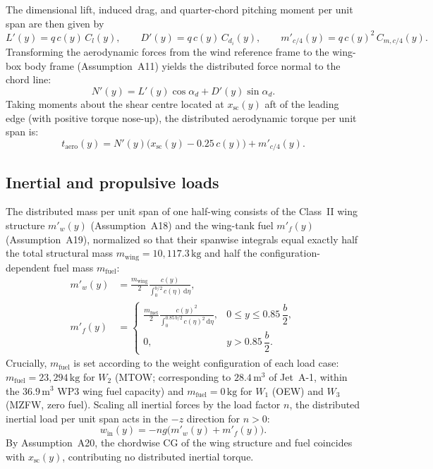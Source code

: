 The dimensional lift, induced drag, and quarter-chord pitching moment per unit span are then given by
\begin{equation}
    L'(y) = q\,c(y)\,C_l(y), \qquad
    D'(y) = q\,c(y)\,C_{d_i}(y), \qquad
    m'_{c/4}(y) = q\,c(y)^2\,C_{m,c/4}(y).
    \label{eq:aero_dimensional}
\end{equation}
Transforming the aerodynamic forces from the wind reference frame to the wing-box body frame (Assumption~A11) yields the distributed force normal to the chord line:
\begin{equation}
    N'(y) = L'(y)\cos\alpha_d + D'(y)\sin\alpha_d.
    \label{eq:normal_force}
\end{equation}
Taking moments about the shear centre located at $x_{\mathrm{sc}}(y)$ aft of the leading edge (with positive torque nose-up), the distributed aerodynamic torque per unit span is:
\begin{equation}
    t_{\mathrm{aero}}(y) = N'(y)\bigl(x_{\mathrm{sc}}(y) - 0.25\,c(y)\bigr) + m'_{c/4}(y).
    \label{eq:aero_torque}
\end{equation}

\subsection{Inertial and propulsive loads}
\label{subsec:inertial_prop_loads}

The distributed mass per unit span of one half-wing consists of the Class~II wing structure $m'_w(y)$ (Assumption~A18) and the wing-tank fuel $m'_f(y)$ (Assumption~A19), normalized so that their spanwise integrals equal exactly half the total structural mass $m_{\mathrm{wing}} = 10{,}117.3\,\text{kg}$ and half the configuration-dependent fuel mass $m_{\mathrm{fuel}}$:
\begin{align}
    m'_w(y) &= \frac{m_{\mathrm{wing}}}{2}\frac{c(y)}{\int_0^{b/2} c(\eta)\,\mathrm{d}\eta}, \label{eq:mw_dist} \\
    m'_f(y) &= \begin{cases}
        \displaystyle \frac{m_{\mathrm{fuel}}}{2}\frac{c(y)^2}{\int_0^{0.85\,b/2} c(\eta)^2\,\mathrm{d}\eta}, & 0 \le y \le 0.85\,\dfrac{b}{2}, \\[10pt]
        0, & y > 0.85\,\dfrac{b}{2}.
    \end{cases}
    \label{eq:mf_dist}
\end{align}
Crucially, $m_{\mathrm{fuel}}$ is set according to the weight configuration of each load case: $m_{\mathrm{fuel}} = 23{,}294\,\text{kg}$ for $W_2$ (MTOW; corresponding to $28.4\,\text{m}^3$ of Jet~A-1, within the $36.9\,\text{m}^3$ WP3 wing fuel capacity) and $m_{\mathrm{fuel}} = 0\,\text{kg}$ for $W_1$ (OEW) and $W_3$ (MZFW, zero fuel). Scaling all inertial forces by the load factor $n$, the distributed inertial load per unit span acts in the $-z$ direction for $n > 0$:
\begin{equation}
    w_{\mathrm{in}}(y) = -n g \bigl(m'_w(y) + m'_f(y)\bigr).
    \label{eq:w_inertia}
\end{equation}
By Assumption~A20, the chordwise CG of the wing structure and fuel coincides with $x_{\mathrm{sc}}(y)$, contributing no distributed inertial torque.


